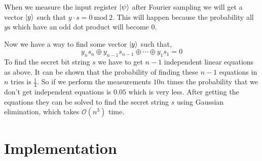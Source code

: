 \documentclass[13pt]{article}
\begin{document}
When we measure the input register $\ket{\psi}$ after Fourier sampling we will get a vector $\ket{y}$ such that $y\cdot s = 0\ \text{mod}\ 2$. This will happen because the probability all $y\text{s}$ which have an odd dot product will become 0.

Now we have a way to find some vector $\ket{y}$ such that,
$$y_n s_n \oplus y_{n-1} s_{n-1} \oplus \cdots \oplus y_1 s_1 = 0$$
To find the secret bit string $s$ we have to get $n-1$ independent linear equations as above. It can be shown that the probability of finding these $n-1$ equations in $n$ tries is $\frac{1}{4}$. So if we perform the measurements $10n$ times the probability that we don't get independent equations is $0.05$ which is very less. After getting the equations they can be solved to find the secret string $s$ using Gaussian elimination, which takes $\mathcal{O}(n^3)$ time.

\section{Implementation}
\end{document}

